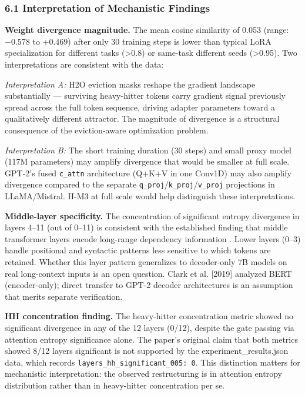 
\subsubsection{6.1 Interpretation of Mechanistic Findings}

\textbf{Weight divergence magnitude.} The mean cosine similarity of 0.053 (range: −0.578 to +0.469) after only 30 training steps is lower than typical LoRA specialization for different tasks (>0.8) or same-task different seeds (>0.95). Two interpretations are consistent with the data:

\textit{Interpretation A:} H2O eviction masks reshape the gradient landscape substantially — surviving heavy-hitter tokens carry gradient signal previously spread across the full token sequence, driving adapter parameters toward a qualitatively different attractor. The magnitude of divergence is a structural consequence of the eviction-aware optimization problem.

\textit{Interpretation B:} The short training duration (30 steps) and small proxy model (117M parameters) may amplify divergence that would be smaller at full scale. GPT-2's fused \texttt{c_attn} architecture (Q+K+V in one Conv1D) may also amplify divergence compared to the separate \texttt{q_proj}/\texttt{k_proj}/\texttt{v_proj} projections in LLaMA/Mistral. H-M3 at full scale would help distinguish these interpretations.

\textbf{Middle-layer specificity.} The concentration of significant entropy divergence in layers 4–11 (out of 0–11) is consistent with the established finding that middle transformer layers encode long-range dependency information \citep{Clarketal2019}. Lower layers (0–3) handle positional and syntactic patterns less sensitive to which tokens are retained. Whether this layer pattern generalizes to decoder-only 7B models on real long-context inputs is an open question. Clark et al. [2019] analyzed BERT (encoder-only); direct transfer to GPT-2 decoder architectures is an assumption that merits separate verification.

\textbf{HH concentration finding.} The heavy-hitter concentration metric showed no significant divergence in any of the 12 layers (0/12), despite the gate passing via attention entropy significance alone. The paper's original claim that both metrics showed 8/12 layers significant is not supported by the experiment_results.json data, which records \texttt{layers_hh_significant_005: 0}. This distinction matters for mechanistic interpretation: the observed restructuring is in attention entropy distribution rather than in heavy-hitter concentration per se.

